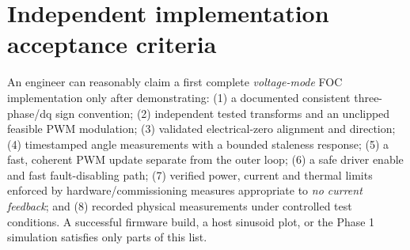 \documentclass[10pt,letterpaper]{article}
\begin{document}
\section{Independent implementation acceptance criteria}
An engineer can reasonably claim a first complete \emph{voltage-mode} FOC implementation only after demonstrating: (1) a documented consistent three-phase/dq sign convention; (2) independent tested transforms and an unclipped feasible PWM modulation; (3) validated electrical-zero alignment and direction; (4) timestamped angle measurements with a bounded staleness response; (5) a fast, coherent PWM update separate from the outer loop; (6) a safe driver enable and fast fault-disabling path; (7) verified power, current and thermal limits enforced by hardware/commissioning measures appropriate to \emph{no current feedback}; and (8) recorded physical measurements under controlled test conditions. A successful firmware build, a host sinusoid plot, or the Phase 1 simulation satisfies only parts of this list.
\end{document}
